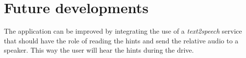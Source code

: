 \chapter{Future developments} \label{chap5}
The application can be improved by integrating the use of a \textit{text2speech} service that should have the role of reading the hints and send the relative audio to a speaker. This way the user will hear the hints during the drive.